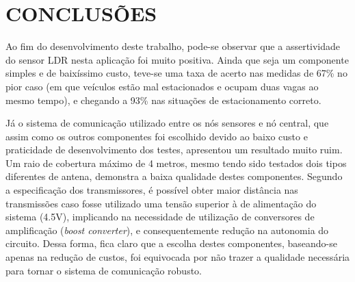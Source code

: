 \documentclass[oneside,openright,12pt]{ufsm_2015} %
\begin{document}
\chapter{CONCLUSÕES}
Ao fim do desenvolvimento deste trabalho, pode-se observar que a assertividade do sensor LDR nesta aplicação foi muito positiva. Ainda que seja um componente simples e de baixíssimo custo, teve-se uma taxa de acerto nas medidas de 67\% no pior caso (em que veículos estão mal estacionados e ocupam duas vagas ao mesmo tempo), e chegando a 93\% nas situações de estacionamento correto. 

Já o sistema de comunicação utilizado entre os nós sensores e nó central, que assim como os outros componentes foi escolhido devido ao baixo custo e praticidade de desenvolvimento dos testes, apresentou um resultado muito ruim. Um raio de cobertura máximo de 4 metros, mesmo tendo sido testados dois tipos diferentes de antena, demonstra a baixa qualidade destes componentes. Segundo a especificação dos transmissores, é possível obter maior distância nas transmissões caso fosse utilizado uma tensão superior à de alimentação do sistema (4.5V), implicando na necessidade de utilização de conversores de amplificação (\textit{boost converter}), e consequentemente redução na autonomia do circuito. Dessa forma, fica claro que a escolha destes componentes, baseando-se apenas na redução de custos, foi equivocada por não trazer a qualidade necessária para tornar o sistema de comunicação robusto.


        




	
	
	
	\apendice %
\end{document}
